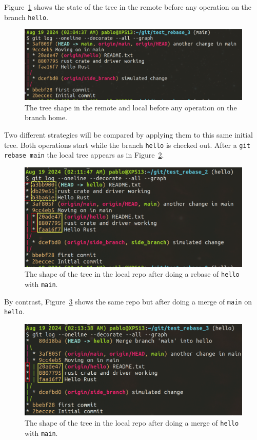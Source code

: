 \documentclass[10pt]{article}
\begin{document}
Figure~\ref{fig:initial-tree} shows the state of the tree in the remote before any operation on the branch \texttt{hello}.

\begin{figure}[hb!]
    \centering
    \includegraphics[width=\textwidth]{images/Tree_before_any_op.png}
    \caption{The tree shape in the remote and local before any operation on the branch home.}
    \label{fig:initial-tree}
\end{figure}

Two different strategies will be compared by applying them to this same initial tree.
Both operations start while the branch \texttt{hello} is checked out. 
After a \texttt{git rebase main} the local tree appears as in Figure~\ref{fig:tree-after-rebase}. 


\begin{figure}[hb!]
    \centering
    \includegraphics[width=\textwidth]{images/Tree_after_rebase_main_on_hello.png}
    \caption{The shape of the tree in the local repo after doing a rebase of \texttt{hello} with \texttt{main}.}
    \label{fig:tree-after-rebase}
\end{figure}

By contrast, Figure~\ref{fig:tree-after-merge} shows the same repo but after doing a merge of \texttt{main} on \texttt{hello}.


\begin{figure}[hb!]
    \centering
    \includegraphics[width=\textwidth]{images/Tree_after_merge_main_on_hello.png}
    \caption{The shape of the tree in the local repo after doing a merge of \texttt{hello} with \texttt{main}.}
    \label{fig:tree-after-merge}
\end{figure}
\end{document}
